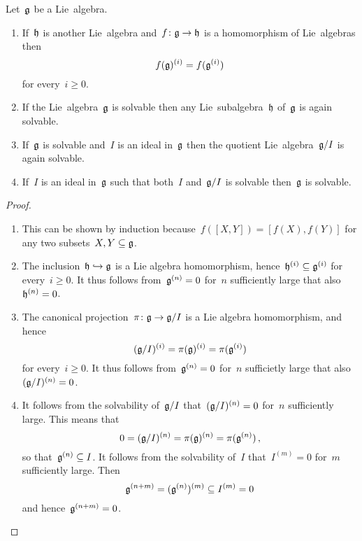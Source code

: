 \begin{proposition}
  \label{properties of solvable and nilpotent}
  Let~$\mathfrak{g}$ be a Lie~algebra.
  \begin{enumerate}
    \item
      If~$\mathfrak{h}$ is another Lie~algebra and~$f \colon \mathfrak{g} \to \mathfrak{h}$ is a homomorphism of Lie~algebras then
      \[
        f(\mathfrak{g})^{(i)}
        =
        f(\mathfrak{g}^{(i)})
      \]
      for every~$i \geq 0$.
    \item
      If the Lie~algebra~$\mathfrak{g}$ is solvable then any Lie~subalgebra~$\mathfrak{h}$ of~$\mathfrak{g}$ is again solvable.
    \item
      If~$\mathfrak{g}$ is solvable and~$I$ is an ideal in~$\mathfrak{g}$ then the quotient Lie~algebra~$\mathfrak{g}/I$ is again solvable.
    \item
      If~$I$ is an ideal in~$\mathfrak{g}$ such that both~$I$ and~$\mathfrak{g}/I$ is solvable then~$\mathfrak{g}$ is solvable.
  \end{enumerate}
\end{proposition}


\begin{proof}
  \leavevmode
  \begin{enumerate}
    \item
      This can be shown by induction because~$f([X,Y]) = [f(X), f(Y)]$ for any two subsets~$X, Y \subseteq \mathfrak{g}$.
    \item
      The inclusion~$\mathfrak{h} \hookrightarrow \mathfrak{g}$ is a Lie algebra homomorphism, hence~$\mathfrak{h}^{(i)} \subseteq \mathfrak{g}^{(i)}$ for every~$i \geq 0$.
      It thus follows from~$\mathfrak{g}^{(n)} = 0$ for~$n$ sufficiently large that also~$\mathfrak{h}^{(n)} = 0$.
    \item
      The canonical projection~$\pi \colon \mathfrak{g} \to \mathfrak{g}/I$ is a Lie algebra homomorphism, and hence
      \[
        (\mathfrak{g}/I)^{(i)}
        =
        \pi(\mathfrak{g})^{(i)}
        =
        \pi(\mathfrak{g}^{(i)})
      \]
      for every~$i \geq 0$.
      It thus follows from~$\mathfrak{g}^{(n)} = 0$ for~$n$ sufficietly large that also~$(\mathfrak{g}/I)^{(n)} = 0$.
    \item
      It follows from the solvability of~$\mathfrak{g}/I$ that~$(\mathfrak{g}/I)^{(n)} = 0$ for~$n$ sufficiently large.
      This means that
      \[
        0
        =
        (\mathfrak{g}/I)^{(n)}
        =
        \pi(\mathfrak{g})^{(n)}
        =
        \pi(\mathfrak{g}^{(n)})  \,,
      \]
      so that~$\mathfrak{g}^{(n)} \subseteq I$.
      It follows from the solvability of~$I$ that~$I^{(m)} = 0$ for~$m$ sufficiently large.
      Then
      \[
        \mathfrak{g}^{(n+m)}
        =
        (\mathfrak{g}^{(n)})^{(m)}
        \subseteq
        I^{(m)}
        =
        0
      \]
      and hence~$\mathfrak{g}^{(n+m)} = 0$.
    \qedhere
  \end{enumerate}
\end{proof}


